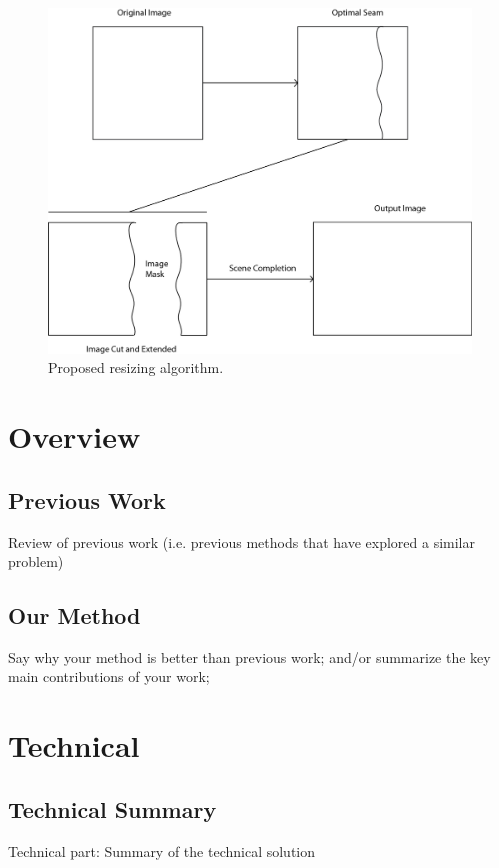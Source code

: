 \documentclass[11pt]{amsart}
\begin{document}
\begin{figure}[htbp]
\begin{center}
\includegraphics[scale=.6]{seamOverview.png}
\caption{Proposed resizing algorithm.}
\label{llamaSeam}
\end{center}
\end{figure}

\section{Overview} 
\subsection{Previous Work}
Review of previous work (i.e. previous methods that have explored a similar problem)

\subsection{Our Method}
Say why your method is better than previous work; and/or summarize the key main contributions of your work; 

\section{Technical}

\subsection{Technical Summary}
Technical part: Summary of the technical solution 
\end{document}
